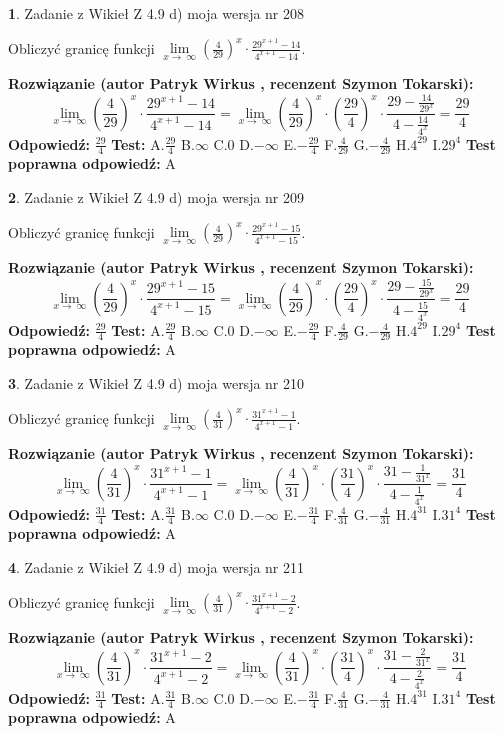 \documentclass[12pt, a4paper]{article}
\theoremstyle{definition} %
\newtheorem{zad}{}
\newcommand{\zadStart}[1]{\begin{zad}#1\newline}
\newcommand{\zadStop}{\end{zad}}
\newcommand{\rozwStart}[2]{\noindent \textbf{Rozwiązanie (autor #1 , recenzent #2): }\newline}
\newcommand{\rozwStop}{\newline}
\newcommand{\odpStart}{\noindent \textbf{Odpowiedź:}\newline}
\newcommand{\odpStop}{\newline}
\newcommand{\testStart}{\noindent \textbf{Test:}\newline}
\newcommand{\testStop}{\newline}
\newcommand{\kluczStart}{\noindent \textbf{Test poprawna odpowiedź:}\newline}
\newcommand{\kluczStop}{\newline}
\begin{document}
\zadStart{Zadanie z Wikieł Z 4.9 d) moja wersja nr 208}


Obliczyć granicę funkcji  $\lim\limits_{x\to\ \infty}(\frac{4}{29})^{x}\cdot\frac{29^{x+1}-14}{4^{x+1}-14}$.
\zadStop
\rozwStart{Patryk Wirkus}{Szymon Tokarski}
$$\lim\limits_{x\to\ \infty}(\frac{4}{29})^{x}\cdot\frac{29^{x+1}-14}{4^{x+1}-14}=\lim\limits_{x\to\ \infty}(\frac{4}{29})^{x}\cdot(\frac{29}{4})^{x} \cdot \frac{29-\frac{14}{29^{x}}}{4-\frac{14}{4^{x}}} = \frac{29}{4}$$
\rozwStop
\odpStart
$\frac{29}{4}$
\odpStop
\testStart
A.$\frac{29}{4}$ B.$\infty$ C.$0$ D.$-\infty$ E.$-\frac{29}{4}$
F.$\frac{4}{29}$ G.$-\frac{4}{29}$
H.$4^{29}$
I.$29^{4}$
\testStop
\kluczStart
A
\kluczStop



\zadStart{Zadanie z Wikieł Z 4.9 d) moja wersja nr 209}


Obliczyć granicę funkcji  $\lim\limits_{x\to\ \infty}(\frac{4}{29})^{x}\cdot\frac{29^{x+1}-15}{4^{x+1}-15}$.
\zadStop
\rozwStart{Patryk Wirkus}{Szymon Tokarski}
$$\lim\limits_{x\to\ \infty}(\frac{4}{29})^{x}\cdot\frac{29^{x+1}-15}{4^{x+1}-15}=\lim\limits_{x\to\ \infty}(\frac{4}{29})^{x}\cdot(\frac{29}{4})^{x} \cdot \frac{29-\frac{15}{29^{x}}}{4-\frac{15}{4^{x}}} = \frac{29}{4}$$
\rozwStop
\odpStart
$\frac{29}{4}$
\odpStop
\testStart
A.$\frac{29}{4}$ B.$\infty$ C.$0$ D.$-\infty$ E.$-\frac{29}{4}$
F.$\frac{4}{29}$ G.$-\frac{4}{29}$
H.$4^{29}$
I.$29^{4}$
\testStop
\kluczStart
A
\kluczStop



\zadStart{Zadanie z Wikieł Z 4.9 d) moja wersja nr 210}


Obliczyć granicę funkcji  $\lim\limits_{x\to\ \infty}(\frac{4}{31})^{x}\cdot\frac{31^{x+1}-1}{4^{x+1}-1}$.
\zadStop
\rozwStart{Patryk Wirkus}{Szymon Tokarski}
$$\lim\limits_{x\to\ \infty}(\frac{4}{31})^{x}\cdot\frac{31^{x+1}-1}{4^{x+1}-1}=\lim\limits_{x\to\ \infty}(\frac{4}{31})^{x}\cdot(\frac{31}{4})^{x} \cdot \frac{31-\frac{1}{31^{x}}}{4-\frac{1}{4^{x}}} = \frac{31}{4}$$
\rozwStop
\odpStart
$\frac{31}{4}$
\odpStop
\testStart
A.$\frac{31}{4}$ B.$\infty$ C.$0$ D.$-\infty$ E.$-\frac{31}{4}$
F.$\frac{4}{31}$ G.$-\frac{4}{31}$
H.$4^{31}$
I.$31^{4}$
\testStop
\kluczStart
A
\kluczStop



\zadStart{Zadanie z Wikieł Z 4.9 d) moja wersja nr 211}


Obliczyć granicę funkcji  $\lim\limits_{x\to\ \infty}(\frac{4}{31})^{x}\cdot\frac{31^{x+1}-2}{4^{x+1}-2}$.
\zadStop
\rozwStart{Patryk Wirkus}{Szymon Tokarski}
$$\lim\limits_{x\to\ \infty}(\frac{4}{31})^{x}\cdot\frac{31^{x+1}-2}{4^{x+1}-2}=\lim\limits_{x\to\ \infty}(\frac{4}{31})^{x}\cdot(\frac{31}{4})^{x} \cdot \frac{31-\frac{2}{31^{x}}}{4-\frac{2}{4^{x}}} = \frac{31}{4}$$
\rozwStop
\odpStart
$\frac{31}{4}$
\odpStop
\testStart
A.$\frac{31}{4}$ B.$\infty$ C.$0$ D.$-\infty$ E.$-\frac{31}{4}$
F.$\frac{4}{31}$ G.$-\frac{4}{31}$
H.$4^{31}$
I.$31^{4}$
\testStop
\kluczStart
A
\kluczStop
\end{document}
